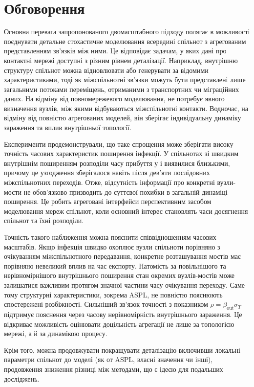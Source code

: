 \section{Обговорення}
\label{sec:discussion}

Основна перевага запропонованого
двомасштабного підходу полягає
в можливості поєднувати детальне
стохастичне моделювання всередині
спільнот з агрегованим представленням
зв'язків між ними. Це відповідає
задачам, у яких дані про контактні
мережі доступні з різним рівнем
деталізації. Наприклад, внутрішню
структуру спільнот можна відновлювати
або генерувати за відомими
характеристиками, тоді як
міжспільнотні зв'язки можуть
бути представлені лише загальними
потоками переміщень, отриманими
з транспортних чи міграційних даних.
На відміну від повномережевого
моделювання, \TS{} не потребує
явного визначення вузлів,
між якими відбуваються
міжспільнотні контакти.
Водночас, на відміну від
повністю агрегованих моделей,
він зберігає індивідуальну
динаміку зараження та вплив
внутрішньої топології.

Експерименти продемонстрували,
що таке спрощення може зберігати
високу точність часових характеристик
поширення інфекції. У спільнотах
зі швидким внутрішнім поширенням
розподіли часу прибуття у \Full{}
і \TS{} виявилися близькими,
причому це узгодження зберігалося
навіть після дев'яти послідовних
міжспільнотних переходів.
Отже, відсутність інформації
про конкретні вузли-мости
не обов'язково призводить
до суттєвої похибки
в загальній динаміці поширення.
Це робить агреговані інтерфейси
перспективним засобом
моделювання мереж спільнот,
коли основний інтерес становлять
часи досягнення спільнот
та їхні розподіли.

Точність такого наближення
можна пояснити співвідношенням
часових масштабів.
Якщо інфекція швидко охоплює
вузли спільноти порівняно
з очікуванням міжспільнотного
передавання, конкретне
розташування мостів має
порівняно невеликий вплив
на час експорту. Натомість
за повільнішого та нерівномірнішого
внутрішнього поширення
стан окремих вузлів-мостів
може залишатися важливим
протягом значної частини
часу очікування переходу.
Саме тому структурні
характеристики, зокрема ASPL,
не повністю пояснюють
спостережені розбіжності.
Сильніший зв'язок точності
з показником
$\rho=\beta_{\mathrm{out}}\sigma_T$
підтримує пояснення через
часову нерівномірність
внутрішнього зараження.
Це відкриває можливість
оцінювати доцільність
агрегації не лише за
топологією мережі,
а й за динамікою процесу.

Крім того, можна продовжувати покращувати деталізацію включивши локальні параметри спільнот до моделі (як от ASPL, власні значення чи інші), продовження зниження різниці між методами, що є ідеєю для подальших досліджень.

